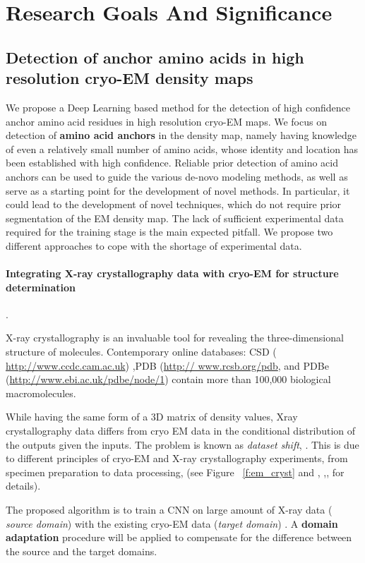 \section{Research Goals And Significance }

\subsection{Detection of anchor amino acids in high resolution cryo-EM density maps }
We propose a Deep Learning based method for the detection of 
high confidence anchor amino acid residues in high resolution cryo-EM maps.
We focus on detection of  {\bf amino acid anchors} in the density map, namely having knowledge of even a relatively small number of amino acids, whose identity and location has been established with high confidence.
Reliable prior detection of amino acid anchors can be used to guide the various de-novo modeling methods, as well as serve as a starting point for the development of novel methods.
In particular, it could lead to the development of novel techniques, which do not require prior segmentation of the EM density map.
The lack of sufficient experimental data required for  the training stage is the main expected pitfall. 
We propose two different approaches to cope with the shortage of experimental data.

 
\paragraph{Integrating X-ray crystallography data with cryo-EM for structure determination}.

X-ray crystallography is an invaluable tool for revealing the  three-dimensional structure of molecules. 
Contemporary online databases: CSD ( \url{http://www.ccdc.cam.ac.uk}) ,PDB (\url{http:// www.rcsb.org/pdb}, and  PDBe (\url{http://www.ebi.ac.uk/pdbe/node/1}) contain more than 100,000 biological macromolecules.


While having the same form of a 3D matrix of density values, Xray crystallography data differs from cryo EM data in the conditional distribution of the outputs given the inputs.
The problem is known as \textit{dataset shift}, \cite{Quinonero-Candela2010 }.
This is due to different principles of cryo-EM and X-ray crystallography experiments, from specimen preparation to data processing, (see Figure ~\ref{f:em_cryst} and \cite{Zanotti2016}, \cite{Zeng2018},\cite{Wang2017},\cite{Venien-Bryan2017} for details).

The proposed algorithm is to train a CNN on large amount of X-ray data ( \textit{source domain}) with the existing cryo-EM data (\textit{target domain}) .
A \textbf{domain adaptation} procedure will be applied to compensate for  the difference  between the source and the target domains. 


